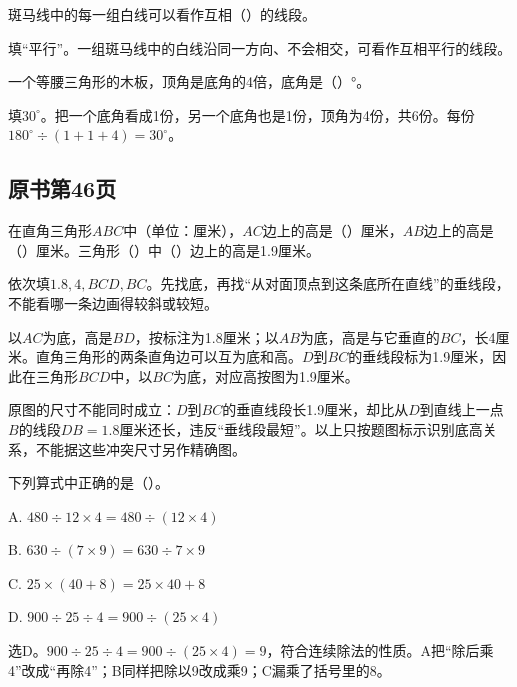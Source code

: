 斑马线中的每一组白线可以看作互相（\hspace{1.8em}）的线段。\par
\begin{BookAnswer}
填“平行”。一组斑马线中的白线沿同一方向、不会相交，可看作互相平行的线段。
\end{BookAnswer}

一个等腰三角形的木板，顶角是底角的4倍，底角是（\hspace{1.8em}）°。\par
\begin{BookAnswer}
填\(30^\circ\)。把一个底角看成1份，另一个底角也是1份，顶角为4份，共6份。每份\(180^\circ\div(1+1+4)=30^\circ\)。
\end{BookAnswer}



\subsection*{原书第46页}

在直角三角形\(ABC\)中（单位：厘米），\allowbreak{}\(AC\)边上的高是（\hspace{1.8em}）厘米，\allowbreak{}\(AB\)边上的高是（\hspace{1.8em}）厘米。三角形（\hspace{1.8em}）中（\hspace{1.8em}）边上的高是1.9厘米。\par
{}
\begin{BookAnswer}
依次填\(1.8,4,BCD,BC\)。先找底，再找“从对面顶点到这条底所在直线”的垂线段，不能看哪一条边画得较斜或较短。\par 以\(AC\)为底，高是\(BD\)，按标注为1.8厘米；以\(AB\)为底，高是与它垂直的\(BC\)，长4厘米。直角三角形的两条直角边可以互为底和高。\(D\)到\(BC\)的垂线段标为1.9厘米，因此在三角形\(BCD\)中，以\(BC\)为底，对应高按图为1.9厘米。\par 原图的尺寸不能同时成立：\(D\)到\(BC\)的垂直线段长1.9厘米，却比从\(D\)到直线上一点\(B\)的线段\(DB=1.8\)厘米还长，违反“垂线段最短”。以上只按题图标示识别底高关系，不能据这些冲突尺寸另作精确图。
\end{BookAnswer}

下列算式中正确的是（\hspace{1.8em}）。\par
\noindent A. \(480\div12\times4=480\div(12\times4)\)\par
\noindent B. \(630\div(7\times9)=630\div7\times9\)\par
\noindent C. \(25\times(40+8)=25\times40+8\)\par
\noindent D. \(900\div25\div4=900\div(25\times4)\)\par
\begin{BookAnswer}
选D。\(900\div25\div4=900\div(25\times4)=9\)，符合连续除法的性质。A把“除后乘4”改成“再除4”；B同样把除以9改成乘9；C漏乘了括号里的8。
\end{BookAnswer}

